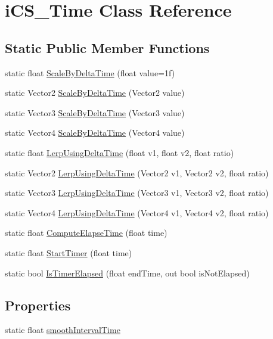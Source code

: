 \hypertarget{classi_c_s___time}{\section{i\+C\+S\+\_\+\+Time Class Reference}
\label{classi_c_s___time}
}
\subsection*{Static Public Member Functions}
\begin{DoxyCompactItemize}
\item 
static float \hyperlink{classi_c_s___time_a320a331ef4b94989196055fc9cb62df4}{Scale\+By\+Delta\+Time} (float value=1f)
\item 
static Vector2 \hyperlink{classi_c_s___time_a194a6a5106f96872c9d8dd260d9d815f}{Scale\+By\+Delta\+Time} (Vector2 value)
\item 
static Vector3 \hyperlink{classi_c_s___time_ac59f27ba45385a8530a9a6ec3df90388}{Scale\+By\+Delta\+Time} (Vector3 value)
\item 
static Vector4 \hyperlink{classi_c_s___time_aa93642df190ca78a952680db885a14f3}{Scale\+By\+Delta\+Time} (Vector4 value)
\item 
static float \hyperlink{classi_c_s___time_a59c0d1f4a80f1f2b4f6e9e3dece002f6}{Lerp\+Using\+Delta\+Time} (float v1, float v2, float ratio)
\item 
static Vector2 \hyperlink{classi_c_s___time_a29cc8b1c82689c48ff06160e60cbd150}{Lerp\+Using\+Delta\+Time} (Vector2 v1, Vector2 v2, float ratio)
\item 
static Vector3 \hyperlink{classi_c_s___time_ad40ab176fc0597216ddb6656efc73f58}{Lerp\+Using\+Delta\+Time} (Vector3 v1, Vector3 v2, float ratio)
\item 
static Vector4 \hyperlink{classi_c_s___time_aaa512ff45069fb8c64a65a513a2b9e71}{Lerp\+Using\+Delta\+Time} (Vector4 v1, Vector4 v2, float ratio)
\item 
static float \hyperlink{classi_c_s___time_a9585685174456b6ab8728d76029efc7e}{Compute\+Elapse\+Time} (float time)
\item 
static float \hyperlink{classi_c_s___time_ac83f306a7923d7962563267c3402eaf1}{Start\+Timer} (float time)
\item 
static bool \hyperlink{classi_c_s___time_a659d7f3f80b5f3b02517955ff38da8c6}{Is\+Timer\+Elapsed} (float end\+Time, out bool is\+Not\+Elapsed)
\end{DoxyCompactItemize}
\subsection*{Properties}
\begin{DoxyCompactItemize}
\item 
static float \hyperlink{classi_c_s___time_a42c76764c4fcd04f0e7d7ea3bc615f69}{smooth\+Interval\+Time}
\end{DoxyCompactItemize}


